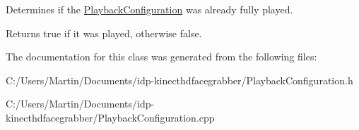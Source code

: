 Determines if the \hyperlink{class_playback_configuration}{Playback\+Configuration} was already fully played. 

\begin{DoxyReturn}{Returns}
true if it was played, otherwise false. 
\end{DoxyReturn}


The documentation for this class was generated from the following files\+:\begin{DoxyCompactItemize}
\item 
C\+:/\+Users/\+Martin/\+Documents/idp-\/kinecthdfacegrabber/Playback\+Configuration.\+h\item 
C\+:/\+Users/\+Martin/\+Documents/idp-\/kinecthdfacegrabber/Playback\+Configuration.\+cpp\end{DoxyCompactItemize}
